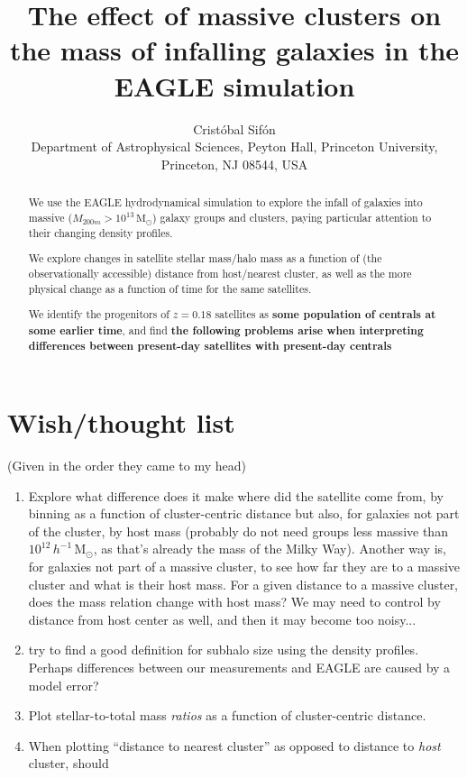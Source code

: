 \documentclass[usenatbib,fleqn]{mnras}
\title[Mass content of infalling galaxies in EAGLE]{The effect of massive clusters on the mass of infalling galaxies in the EAGLE simulation}
\author[C.\ Sif\'on]{Crist\'obal Sif\'on
\\
Department of Astrophysical Sciences, Peyton Hall, Princeton University, Princeton, NJ 08544, USA
}
\newcommand{\Msun}{\mathrm{M}_\odot}
\begin{document}
\label{firstpage}
\pagerange{\pageref{firstpage}--\pageref{lastpage}}


\maketitle

\begin{abstract}
  We use the EAGLE hydrodynamical simulation to explore the infall of galaxies into massive ($M_{200m}>10^{13}\,\Msun$) galaxy groups and clusters, paying particular attention to their changing density profiles.
  
  We explore changes in satellite stellar mass/halo mass as a function of (the observationally accessible) distance from host/nearest cluster, as well as the more physical change as a function of time for the same satellites.
  
  We identify the progenitors of $z=0.18$ satellites as \textbf{some population of centrals at some earlier time}, and find \textbf{the following problems arise when interpreting differences between present-day satellites with present-day centrals}

\end{abstract}



\section{Wish/thought list}

(Given in the order they came to my head)

\begin{enumerate}
  \item Explore what difference does it make where did the satellite come from, by binning as a function of cluster-centric distance but also, for galaxies not part of the cluster, by host mass (probably do not need groups less massive than $10^{12}\,h^{-1}\,\Msun$, as that's already the mass of the Milky Way). Another way is, for galaxies not part of a massive cluster, to see how far they are to a massive cluster and what is their host mass. For a given distance to a massive cluster, does the mass relation change with host mass? We may need to control by distance from host center as well, and then it may become too noisy...
  \item try to find a good definition for subhalo size using the density profiles. Perhaps differences between our measurements and EAGLE are caused by a model error?
  \item Plot stellar-to-total mass \emph{ratios} as a function of cluster-centric distance.
  \item When plotting ``distance to nearest cluster'' as opposed to distance to \emph{host} cluster, should 
\end{enumerate}
\end{document}
